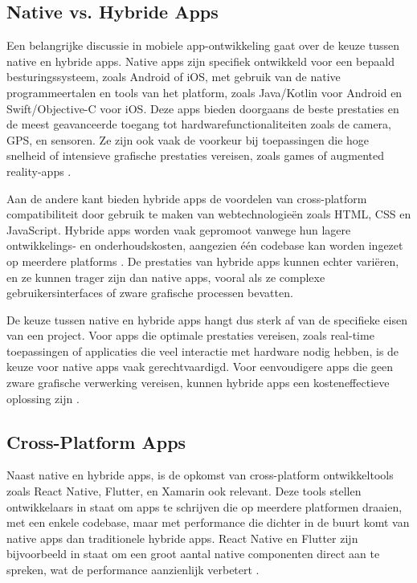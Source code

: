 \subsection{Native vs. Hybride Apps} 
\noindent Een belangrijke discussie in mobiele app-ontwikkeling gaat over de keuze tussen native en hybride apps. Native apps zijn specifiek ontwikkeld voor een bepaald besturingssysteem, zoals Android of iOS, met gebruik van de native programmeertalen en tools van het platform, zoals Java/Kotlin voor Android en Swift/Objective-C voor iOS. Deze apps bieden doorgaans de beste prestaties en de meest geavanceerde toegang tot hardwarefunctionaliteiten zoals de camera, GPS, en sensoren. Ze zijn ook vaak de voorkeur bij toepassingen die hoge snelheid of intensieve grafische prestaties vereisen, zoals games of augmented reality-apps \autocite{Lau2022}.

Aan de andere kant bieden hybride apps de voordelen van cross-platform compatibiliteit door gebruik te maken van webtechnologieën zoals HTML, CSS en JavaScript. Hybride apps worden vaak gepromoot vanwege hun lagere ontwikkelings- en onderhoudskosten, aangezien één codebase kan worden ingezet op meerdere platforms \autocite{Singh2024}. De prestaties van hybride apps kunnen echter variëren, en ze kunnen trager zijn dan native apps, vooral als ze complexe gebruikersinterfaces of zware grafische processen bevatten.

De keuze tussen native en hybride apps hangt dus sterk af van de specifieke eisen van een project. Voor apps die optimale prestaties vereisen, zoals real-time toepassingen of applicaties die veel interactie met hardware nodig hebben, is de keuze voor native apps vaak gerechtvaardigd. Voor eenvoudigere apps die geen zware grafische verwerking vereisen, kunnen hybride apps een kosteneffectieve oplossing zijn \autocite{Microsoft}.

\subsection{Cross-Platform Apps} 
\noindent Naast native en hybride apps, is de opkomst van cross-platform ontwikkeltools zoals React Native, Flutter, en Xamarin ook relevant. Deze tools stellen ontwikkelaars in staat om apps te schrijven die op meerdere platformen draaien, met een enkele codebase, maar met performance die dichter in de buurt komt van native apps dan traditionele hybride apps. React Native en Flutter zijn bijvoorbeeld in staat om een groot aantal native componenten direct aan te spreken, wat de performance aanzienlijk verbetert \autocite{Soegaard2024}.

